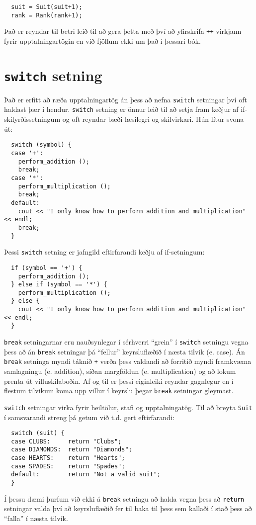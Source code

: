 \begin{verbatim}
  suit = Suit(suit+1);
  rank = Rank(rank+1);
\end{verbatim}
%
Það er reyndar til betri leið til að gera þetta með því að yfirskrifa {\tt ++} virkjann fyrir
upptalningartögin en við fjöllum ekki um það í þessari bók. 

\section{{\tt switch} setning}

Það er erfitt að ræða upptalningartög án þess að nefna {\tt switch} setningar því oft haldast þær í hendur.
{\tt switch} setning er önnur leið til að setja fram keðjur af if-skilyrðissetningum og oft reyndar bæði læsilegri og skilvirkari. 
Hún lítur svona út:

\begin{verbatim}
  switch (symbol) {
  case '+':
    perform_addition ();
    break;
  case '*':
    perform_multiplication ();
    break;
  default:
    cout << "I only know how to perform addition and multiplication" << endl;
    break;
  }
\end{verbatim}
%
Þessi {\tt switch} setning er jafngild eftirfarandi keðju af if-setningum:

\begin{verbatim}
  if (symbol == '+') {
    perform_addition ();
  } else if (symbol == '*') {
    perform_multiplication ();
  } else {
    cout << "I only know how to perform addition and multiplication" << endl;
  }
\end{verbatim}
%
{\tt break} setningarnar eru nauðsynlegar í sérhverri ``grein'' í 
{\tt switch} setningu vegna þess að án {\tt break} setningar þá ``fellur'' keyrsluflæðið í næsta tilvik (e. case).
Án {\tt break} setninga myndi táknið {\tt +} verða þess valdandi að forritið myndi framkvæma
samlagningu (e. addition), síðan margföldun (e. multiplication) og að lokum prenta út villuskilaboðin.
Af og til er þessi eiginleiki reyndar gagnlegur en í flestum tilvikum koma upp villur í keyrslu þegar 
{\tt break} setningar gleymast.


{\tt switch} setningar virka fyrir heiltölur, stafi og upptalningatög.
Til að breyta {\tt Suit} í samsvarandi streng þá getum við t.d. gert eftirfarandi: 

\begin{verbatim}
  switch (suit) {
  case CLUBS:     return "Clubs";
  case DIAMONDS:  return "Diamonds";
  case HEARTS:    return "Hearts";
  case SPADES:    return "Spades";
  default:        return "Not a valid suit";
  }
\end{verbatim}
%
Í þessu dæmi þurfum við ekki á {\tt break} setningu að halda vegna þess að 
{\tt return} setningar valda því að keyrsluflæðið fer til baka til þess sem kallaði í stað þess
að ``falla'' í næsta tilvik. 

